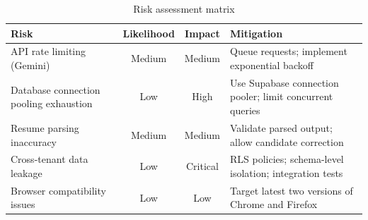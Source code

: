 \begin{table}[htbp]
\centering
\caption{Risk assessment matrix}
\label{tab:risk}
\small
\begin{tabular}{p{2in}ccp{2.2in}}
\toprule
\textbf{Risk} & \textbf{Likelihood} & \textbf{Impact} & \textbf{Mitigation} \\
\midrule
API rate limiting (Gemini) & Medium & Medium & Queue requests; implement exponential backoff \\
Database connection pooling exhaustion & Low & High & Use Supabase connection pooler; limit concurrent queries \\
Resume parsing inaccuracy & Medium & Medium & Validate parsed output; allow candidate correction \\
Cross-tenant data leakage & Low & Critical & RLS policies; schema-level isolation; integration tests \\
Browser compatibility issues & Low & Low & Target latest two versions of Chrome and Firefox \\
\bottomrule
\end{tabular}
\end{table}

